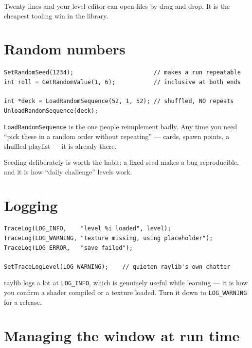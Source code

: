 Twenty lines and your level editor can open files by drag and drop. It is the
cheapest tooling win in the library.

\section{Random numbers}

\begin{lstlisting}
SetRandomSeed(1234);                       // makes a run repeatable
int roll = GetRandomValue(1, 6);           // inclusive at both ends

int *deck = LoadRandomSequence(52, 1, 52); // shuffled, NO repeats
UnloadRandomSequence(deck);
\end{lstlisting}

\lstinline|LoadRandomSequence| is the one people reimplement badly. Any time you
need ``pick these in a random order without repeating'' --- cards, spawn points,
a shuffled playlist --- it is already there.

Seeding deliberately is worth the habit: a fixed seed makes a bug reproducible,
and it is how ``daily challenge'' levels work.

\section{Logging}

\begin{lstlisting}
TraceLog(LOG_INFO,    "level %i loaded", level);
TraceLog(LOG_WARNING, "texture missing, using placeholder");
TraceLog(LOG_ERROR,   "save failed");

SetTraceLogLevel(LOG_WARNING);    // quieten raylib's own chatter
\end{lstlisting}

raylib logs a lot at \lstinline|LOG_INFO|, which is genuinely useful while
learning --- it is how you confirm a shader compiled or a texture loaded. Turn it
down to \lstinline|LOG_WARNING| for a release.

\section{Managing the window at run time}

